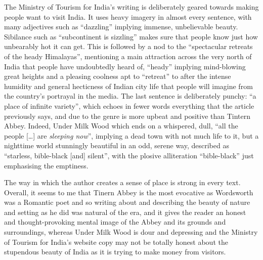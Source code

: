 \documentclass[11pt,a4paper]{article}
\begin{document}
The Ministry of Tourism for India's writing is deliberately geared towards making people want to visit India. It uses heavy imagery in almost every sentence, with many adjectives such as ``dazzling'' implying immense, unbelievable beauty. Sibilance such as ``subcontinent is sizzling'' makes sure that people know just how unbearably hot it can get. This is followed by a nod to the ``spectacular retreats of the heady Himalayas'', mentioning a main attraction across the very north of India that people have undoubtedly heard of, ``heady'' implying mind-blowing great heights and a pleasing coolness apt to ``retreat'' to after the intense humidity and general hecticness of Indian city life that people will imagine from the country's portrayal in the media. The last sentence is deliberately punchy: ``a place of infinite variety'', which echoes in fewer words everything that the article previously says, and due to the genre is more upbeat and positive than Tintern Abbey. Indeed, Under Milk Wood which ends on a whispered, dull, ``all the people [\ldots] are \textit{sleeping now}'', implying a dead town with not much life to it, but a nighttime world stunningly beautiful in an odd, serene way, described as ``starless, bible-black [and] silent'', with the plosive alliteration ``bible-black'' just emphasising the emptiness.

The way in which the author creates a sense of place is strong in every text. Overall, it seems to me that Tinern Abbey is the most evocative as Wordsworth was a Romantic poet and so writing about and describing the beauty of nature and setting as he did was natural of the era, and it gives the reader an honest and thought-provoking mental image of the Abbey and its grounds and surroundings, whereas Under Milk Wood is dour and depressing and the Ministry of Tourism for India's website copy may not be totally honest about the stupendous beauty of India as it is trying to make money from visitors. 
\end{document}
